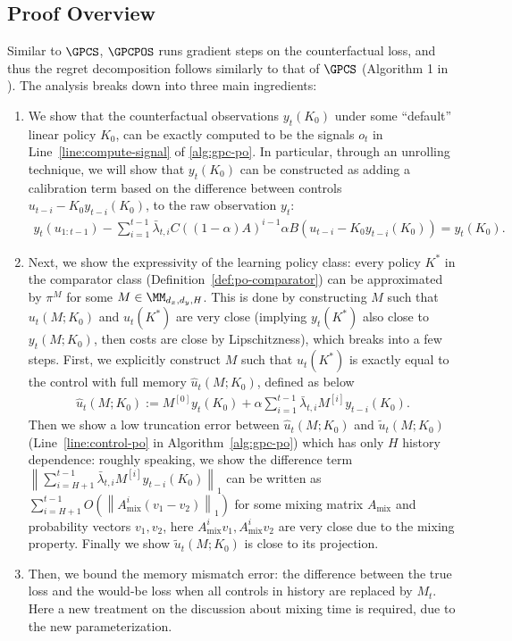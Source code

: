 \subsection{Proof Overview}
Similar to $\GPCS$, $\GPCPOS$ runs gradient steps on the counterfactual loss, and thus the regret decomposition follows similarly to that of $\GPCS$ (Algorithm 1 in \cite{golowich2024online}). The analysis breaks down into three main ingredients: 
\begin{enumerate}
    \item We show that the counterfactual observations $y_t(K_0)$ under some ``default'' linear policy $K_0$, can be exactly computed to be the signals $o_t$ in Line~\ref{line:compute-signal} of \cref{alg:gpc-po}. In particular, through an unrolling technique, we will show that $y_t(K_0)$ can be constructed as adding a calibration term based on the difference between controls $u_{t-i} - K_0 y_{t-i}(K_0)$, to the raw observation $y_t$:
    \begin{align*} y_t(u_{1:t-1}) - \sum_{i=1}^{t-1} \bar\lambda_{t,i}C((1-\alpha)A)^{i-1}\alpha B(u_{t-i} - K_0 y_{t-i}(K_0)) = y_t(K_0).\end{align*}
   
    \item Next, we show the expressivity of the learning policy class: every policy $K^*$ in the comparator class (Definition~\ref{def:po-comparator}) can be approximated by $\pi^M$ for some $M \in \MM_{d_x,d_y,H}$. This is done by constructing $M$ such that $u_t(M;K_0)$ and $u_t(K^*)$ are very close (implying $y_t(K^*)$ also close to $y_t(M;K_0)$, then costs are close by Lipschitzness), which breaks into a few steps. First, we explicitly construct $M$ such that $u_t(K^*)$ is exactly equal to the control with full memory $\hat{u}_t(M;K_0)$, defined as below 
\begin{align*}
\hat{u}_{t}(M;K_0):=M^{[0]}y_t(K_0)+\alpha\sum_{i=1}^{t-1}\bar{\lambda}_{t,i}M^{[i]}y_{t-i}(K_0).
\end{align*}
    Then we show a low truncation error between $\hat{u}_t(M;K_0)$ and $\tilde{u}_t(M;K_0)$ (Line~\ref{line:control-po} in Algorithm~\ref{alg:gpc-po}) which has only $H$ history dependence: roughly speaking, we show the difference term $\left\|\sum_{i=H+1}^{t-1}\bar{\lambda}_{t,i}M^{[i]}y_{t-i}(K_0)\right\|_1$ can be written as $\sum_{i=H+1}^{t-1} O\left(\left\|A_{\text{mix}}^i(v_1-v_2)\right\|_1\right)$ for some mixing matrix $A_{\text{mix}}$ and probability vectors $v_1,v_2$, here $A_{\text{mix}}^iv_1, A_{\text{mix}}^iv_2$ are very close due to the mixing property. Finally we show $\tilde{u}_t(M;K_0)$ is close to its projection. 

    
    \item Then, we bound the memory mismatch error: the difference between the true loss and the would-be loss when all controls in history are replaced by $M_t$. Here a new treatment on the discussion about mixing time is required, due to the new parameterization.
\end{enumerate}
